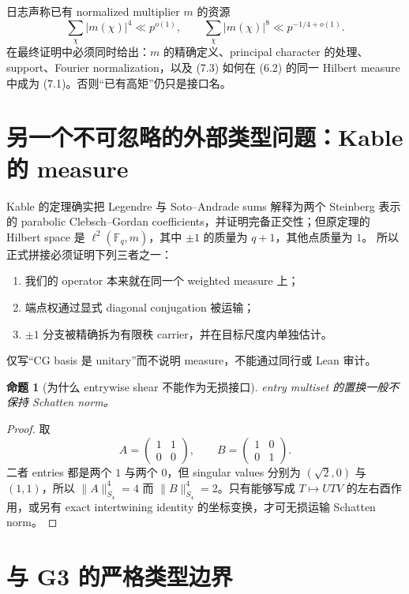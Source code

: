 \documentclass[11pt,a4paper]{ctexart}
\newtheorem{proposition}[theorem]{命题}
\theoremstyle{definition}
\newcommand{\F}{\mathbb F}
\newcommand{\1}{\mathbf 1}
\begin{document}
日志声称已有 normalized multiplier $m$ 的资源
\[
\sum_\chi|m(\chi)|^4\ll p^{o(1)},
\qquad
\sum_\chi|m(\chi)|^8\ll p^{-1/4+o(1)}.
\tag{7.3}
\]
在最终证明中必须同时给出：$m$ 的精确定义、principal character 的处理、
support、Fourier normalization，以及 (7.3) 如何在 (6.2) 的同一 Hilbert
measure 中成为 (7.1)。否则“已有高矩”仍只是接口名。

\section{另一个不可忽略的外部类型问题：Kable 的 measure}

Kable 的定理确实把 Legendre 与 Soto--Andrade sums 解释为两个 Steinberg
表示的 parabolic Clebsch--Gordan coefficients，并证明完备正交性；但原定理的
Hilbert space 是 $\ell^2(\F_q,m)$，其中 $\pm1$ 的质量为 $q+1$，其他点质量为 $1$。
所以正式拼接必须证明下列三者之一：
\begin{enumerate}
\item 我们的 operator 本来就在同一个 weighted measure 上；
\item 端点权通过显式 diagonal conjugation 被运输；
\item $\pm1$ 分支被精确拆为有限秩 carrier，并在目标尺度内单独估计。
\end{enumerate}
仅写“CG basis 是 unitary”而不说明 measure，不能通过同行或 Lean 审计。

\begin{proposition}[为什么 entrywise shear 不能作为无损接口]
entry multiset 的置换一般不保持 Schatten norm。
\end{proposition}

\begin{proof}
取
\[
A=\begin{pmatrix}1&1\\0&0\end{pmatrix},\qquad
B=\begin{pmatrix}1&0\\0&1\end{pmatrix}.
\]
二者 entries 都是两个 $1$ 与两个 $0$，但 singular values 分别为
$(\sqrt2,0)$ 与 $(1,1)$，所以 $\|A\|_{S_4}^4=4$ 而
$\|B\|_{S_4}^4=2$。只有能够写成 $T\mapsto UTV$ 的左右酉作用，或另有
exact intertwining identity 的坐标变换，才可无损运输 Schatten norm。
\end{proof}

\section{与 G3 的严格类型边界}
\end{document}
